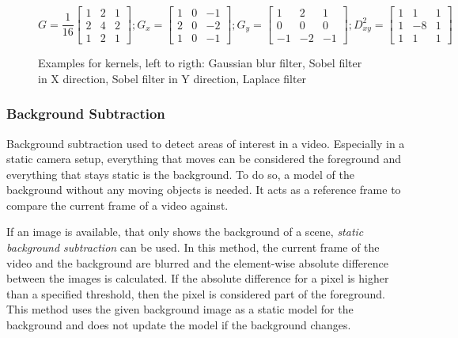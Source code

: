 \begin{figure}[h!]
\begin{equation*}
    G = 
    \dfrac{1}{16}
    \begin{bmatrix}
    1 & 2 & 1 \\
    2 & 4 & 2 \\
    1 & 2 & 1
    \end{bmatrix}
    ;
    G_x = 
    \begin{bmatrix}
    1 & 0 & -1 \\
    2 & 0 & -2 \\
    1 & 0 & -1
    \end{bmatrix}
    ;
    G_y = 
    \begin{bmatrix}
    1 & 2 & 1 \\
    0 & 0 & 0 \\
    -1 & -2 & -1
    \end{bmatrix}
    ;
    D_{xy}^{2} = 
    \begin{bmatrix}
    1 & 1 & 1 \\
    1 & -8 & 1 \\
    1 & 1 & 1
    \end{bmatrix}
\end{equation*}
\caption[Examples for kernels]{Examples for kernels, left to rigth: Gaussian blur filter, Sobel filter in X direction, Sobel filter in Y direction, Laplace filter}
\label{eq:sota:kernels}
\end{figure}

\subsubsection{Background Subtraction}
Background subtraction used to detect areas of interest in a video.
Especially in a static camera setup, everything that moves can be considered the foreground and everything that stays static is the background. 
To do so, a model of the background without any moving objects is needed.
It acts as a reference frame to compare the current frame of a video against.

If an image is available, that only shows the background of a scene,
\emph{static background subtraction} can be used.
In this method, the current frame of the video and the background are blurred 
and the element-wise absolute difference between the images is calculated.
If the absolute difference for a pixel is higher than a specified threshold, then the pixel is considered part of the foreground.
This method uses the given background image as a static model for the background and does not update the model if the background changes.

